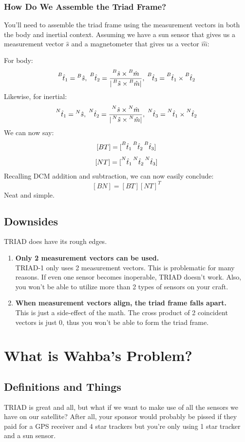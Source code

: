 \documentclass[a4paper,14pt]{extreport}
\newcommand{\ps}[2]{\prescript{#2}{}{\hat{#1}}}
\begin{document}
\subsection{How Do We Assemble the Triad Frame?}
You'll need to assemble the triad frame using the measurement vectors in both the body and inertial context. Assuming we have a sun sensor that gives us a measurement vector $\hat{s}$ and a magnetometer that gives us a vector $\hat{m}$:
\begin{center}
For body:
\[
\ps{t}{B}_1=\ps{s}{B},\;\ps{t}{B}_2=\dfrac{\ps{s}{B}\times\ps{m}{B}}{|\ps{s}{B}\times\ps{m}{B}|},\;\ps{t}{B}_3 = \ps{t}{B}_1\times\ps{t}{B}_2
\]
Likewise, for inertial:
\[
\ps{t}{N}_1=\ps{s}{N},\;\ps{t}{N}_2=\dfrac{\ps{s}{N}\times\ps{m}{N}}{|\ps{s}{N}\times\ps{m}{N}|},\;\ps{t}{N}_3 = \ps{t}{N}_1\times\ps{t}{N}_2
\]
We can now say:
\[
[BT]=[\ps{t}{B}_1 \ps{t}{B}_2 \ps{t}{B}_3]
\]
\[
[NT]=[\ps{t}{N}_1 \ps{t}{N}_2 \ps{t}{N}_3]
\]
Recalling DCM addition and subtraction, we can now easily conclude:
\[
[BN] = [BT][NT]^T
\]
Neat and simple.
\end{center}
\section{Downsides}
TRIAD does have its rough edges.
\begin{enumerate}
\item{\textbf{Only 2 measurement vectors can be used.}}\\
TRIAD-1 only uses 2 measurement vectors. This is problematic for many reasons. If even one sensor becomes inoperable, TRIAD doesn't work. Also, you won't be able to utilize more than 2 types of sensors on your craft.
\item{\textbf{When measurement vectors align, the triad frame falls apart.}}\\
This is just a side-effect of the math. The cross product of 2 coincident vectors is just 0, thus you won't be able to form the triad frame.
\end{enumerate}
\chapter{What is Wahba's Problem?}
\section{Definitions and Things}
TRIAD is great and all, but what if we want to make use of all the sensors we have on our satellite? After all, your sponsor would probably be pissed if they paid for a GPS receiver and 4 star trackers but you're only using 1 star tracker and a sun sensor.
\end{document}
